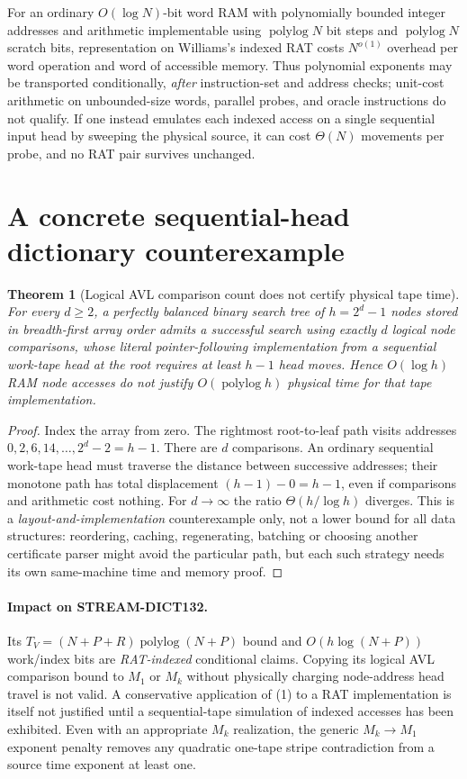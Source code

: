 \documentclass[11pt]{article}
\newtheorem{theorem}{Theorem}
\begin{document}
For an ordinary $O(\log N)$-bit word RAM with polynomially bounded integer addresses and arithmetic implementable using $\operatorname{polylog}N$ bit steps and $\operatorname{polylog}N$ scratch bits, representation on Williams's indexed RAT costs $N^{o(1)}$ overhead per word operation and word of accessible memory. Thus polynomial exponents may be transported conditionally, \emph{after} instruction-set and address checks; unit-cost arithmetic on unbounded-size words, parallel probes, and oracle instructions do not qualify. If one instead emulates each indexed access on a single sequential input head by sweeping the physical source, it can cost $\Theta(N)$ movements per probe, and no RAT pair survives unchanged.

\section{A concrete sequential-head dictionary counterexample}
\begin{theorem}[Logical AVL comparison count does not certify physical tape time]\label{th:dict}
For every $d\ge2$, a perfectly balanced binary search tree of $h=2^d-1$ nodes stored in breadth-first array order admits a successful search using exactly $d$ logical node comparisons, whose \emph{literal pointer-following implementation} from a sequential work-tape head at the root requires at least $h-1$ head moves. Hence $O(\log h)$ RAM node accesses do not justify $O(\operatorname{polylog}h)$ \emph{physical time} for that tape implementation.
\end{theorem}
\begin{proof}
Index the array from zero. The rightmost root-to-leaf path visits addresses $0,2,6,14,\ldots,2^d-2=h-1$. There are $d$ comparisons. An ordinary sequential work-tape head must traverse the distance between successive addresses; their monotone path has total displacement $(h-1)-0=h-1$, even if comparisons and arithmetic cost nothing. For $d\to\infty$ the ratio $\Theta(h/\log h)$ diverges. This is a \emph{layout-and-implementation} counterexample only, not a lower bound for all data structures: reordering, caching, regenerating, batching or choosing another certificate parser might avoid the particular path, but each such strategy needs its own same-machine time and memory proof.
\end{proof}
\paragraph{Impact on STREAM-DICT132.} Its $T_V=(N+P+R)\operatorname{polylog}(N+P)$ bound and $O(h\log(N+P))$ work/index bits are \emph{RAT-indexed} conditional claims. Copying its logical AVL comparison bound to $M_1$ or $M_k$ without physically charging node-address head travel is not valid. A conservative application of (1) to a RAT implementation is itself not justified until a sequential-tape simulation of indexed accesses has been exhibited. Even with an appropriate $M_k$ realization, the generic $M_k\to M_1$ exponent penalty removes any quadratic one-tape stripe contradiction from a source time exponent at least one.
\end{document}

